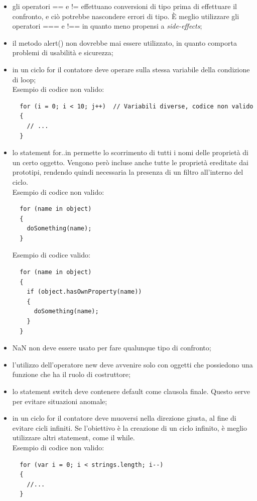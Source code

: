 \begin{itemize}
	\item gli operatori == e != effettuano conversioni di tipo prima di effettuare il confronto, e ciò potrebbe nascondere errori di tipo. È meglio utilizzare gli operatori === e !== in quanto meno propensi a \textit{side-effects};
	\item il metodo alert() non dovrebbe mai essere utilizzato, in quanto comporta problemi di usabilità e sicurezza;
	\item in un ciclo for il contatore deve operare sulla stessa variabile della condizione di loop;\\
Esempio di codice non valido:
\begin{verbatim}
  for (i = 0; i < 10; j++)  // Variabili diverse, codice non valido
  {  
    // ...
  }
\end{verbatim}
	\item lo statement for..in permette lo scorrimento di tutti i nomi delle proprietà di un certo oggetto. Vengono però incluse anche tutte le proprietà ereditate dai prototipi, rendendo quindi necessaria la presenza di un filtro all'interno del ciclo.\\
Esempio di codice non valido:
\begin{verbatim}
  for (name in object) 
  {
    doSomething(name); 
  }
\end{verbatim}
Esempio di codice valido:
\begin{verbatim}
  for (name in object) 
  {
    if (object.hasOwnProperty(name)) 
    {
      doSomething(name);
    }
  }
\end{verbatim}
	\item NaN non deve essere usato per fare qualunque tipo di confronto;
	\item l'utilizzo dell'operatore new deve avvenire solo con oggetti che possiedono una funzione che ha il ruolo di costruttore;
	\item lo statement switch deve contenere default come clausola finale. Questo serve per evitare situazioni anomale;
	\item in un ciclo for il contatore deve muoversi nella direzione giusta, al fine di evitare cicli infiniti. Se l'obiettivo è la creazione di un ciclo infinito, è meglio utilizzare altri statement, come il while.\\
Esempio di codice non valido:
\begin{verbatim}
  for (var i = 0; i < strings.length; i--) 
  { 
    //...
  }
\end{verbatim}

\end{itemize}
